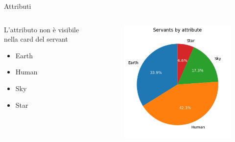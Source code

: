 \documentclass{beamer}
\begin{document}
\begin{darkframes}
  \begin{frame}{Attributi}
    \begin{columns}
      \begin{column}{0.25\textwidth}
        L'attributo non è visibile nella card del servant
        \begin{itemize}
          \item Earth
          \item Human
          \item Sky
          \item Star
        \end{itemize}
      \end{column}
      \begin{column}{0.75\textwidth}
        \begin{figure}
          \centering
          \includegraphics[scale=0.65]{./images/frequency_by_attribute.png}
        \end{figure}
      \end{column}
    \end{columns}
  \end{frame}


\end{darkframes}
\end{document}
